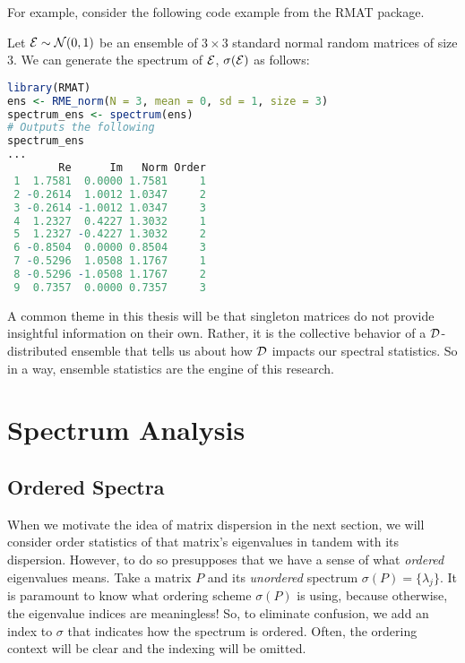 \medskip
\noindent For example, consider the following code example from the RMAT package.
\begin{code}
Let $\mathcal{E} \sim \mathcal{N}(0,1)$ be an ensemble of $3 \times 3$ standard normal random matrices of size $3$. We can generate the spectrum of $\mathcal{E}$, $\sigma(\mathcal{E})$ as follows:
\end{code}

\begin{lstlisting}[language=R]
library(RMAT)
ens <- RME_norm(N = 3, mean = 0, sd = 1, size = 3)
spectrum_ens <- spectrum(ens)
# Outputs the following
spectrum_ens
...
        Re      Im   Norm Order
 1  1.7581  0.0000 1.7581     1
 2 -0.2614  1.0012 1.0347     2
 3 -0.2614 -1.0012 1.0347     3
 4  1.2327  0.4227 1.3032     1
 5  1.2327 -0.4227 1.3032     2
 6 -0.8504  0.0000 0.8504     3
 7 -0.5296  1.0508 1.1767     1
 8 -0.5296 -1.0508 1.1767     2
 9  0.7357  0.0000 0.7357     3
\end{lstlisting}

A common theme in this thesis will be that singleton matrices do not provide insightful information on their own. Rather, it is the collective behavior of a $\mathcal{D}$-distributed ensemble that tells us about how $\mathcal{D}$ impacts our spectral statistics. So in a way, ensemble statistics are the engine of this research.


\newpage
\section{Spectrum Analysis}


\subsection{Ordered Spectra}

When we motivate the idea of matrix dispersion in the next section, we will consider order statistics of that matrix's eigenvalues in tandem with its dispersion. However, to do so presupposes that we have a sense of what \textit{ordered} eigenvalues means. Take a matrix $P$ and its \textit{unordered} spectrum $\sigma(P) = \{\lambda_j\}$. It is paramount to know what ordering scheme $\sigma(P)$ is using, because otherwise, the eigenvalue indices are meaningless! So, to eliminate confusion, we add an index to $\sigma$ that indicates how the spectrum is ordered. Often, the ordering context will be clear and the indexing will be omitted.


